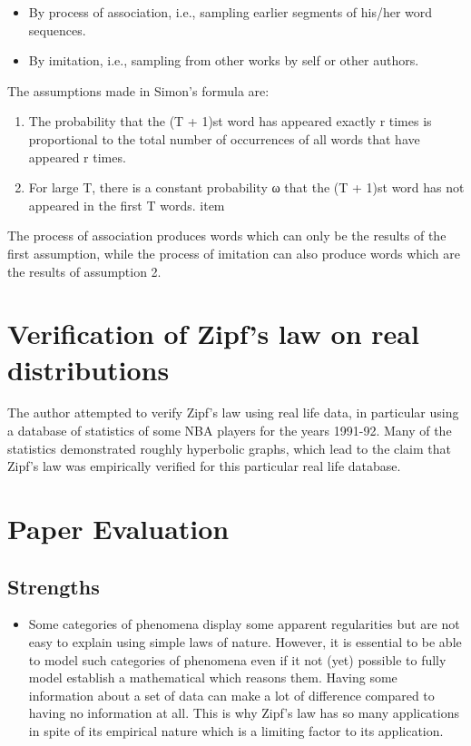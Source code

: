 \documentclass{article} \usepackage{hyperref} \usepackage{graphicx}
\begin{document}
\begin{itemize}
  \item By process of association, i.e., sampling earlier segments of
his/her word sequences.
  \item By imitation, i.e., sampling from other works by self or other
authors.
\end{itemize}

The assumptions made in Simon's formula are:
\begin{enumerate}
   \item The probability that the (T + 1)st word has appeared exactly
r times is proportional to the total number of occurrences of all
words that have appeared r times.
   \item For large T, there is a constant probability ω that the (T +
1)st word has not appeared in the first T words. item
\end{enumerate}

The process of association produces words which can only be the
results of the first assumption, while the process of imitation can
also produce words which are the results of assumption 2.

\section{Verification of Zipf's law on real distributions}

The author attempted to verify Zipf's law using real life data, in
particular using a database of statistics of some NBA players for the
years 1991-92. Many of the statistics demonstrated roughly hyperbolic
graphs, which lead to the claim that Zipf's law was empirically
verified for this particular real life database.

\section{Paper Evaluation}
\subsection{Strengths}
\begin{itemize}
\item Some categories of phenomena display some apparent regularities
but are not easy to explain using simple laws of nature. However, it
is essential to be able to model such categories of phenomena even if
it not (yet) possible to fully model establish a mathematical which
reasons them. Having some information about a set of data can make a
lot of difference compared to having no information at all. This is
why Zipf's law has so many applications in spite of its empirical
nature which is a limiting factor to its application.
\end{itemize}
\end{document}
